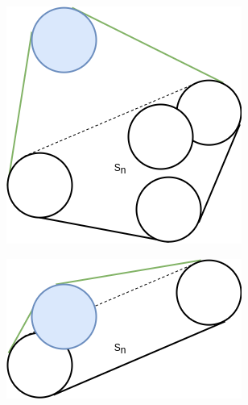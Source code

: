\documentclass[a4paper,11pt]{article}
\theoremstyle{mytheor}
\begin{document}
\begin{figure}
    \centering
    
    \begin{subfigure}{0.4\textwidth}
        \includegraphics[width=1.0\linewidth]{png/go1.png}
        \caption{}
    \end{subfigure}

    \begin{subfigure}{0.4\textwidth}
        \includegraphics[width=1.0\linewidth]{png/go2.png}
        \caption{}
    \end{subfigure}


\end{figure}
\end{document}
